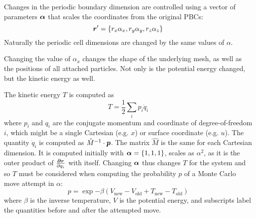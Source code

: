 
 \label{sec:npt}

Changes in the periodic boundary dimension are controlled using a vector of parameters $\boldsymbol{\alpha}$ that scales the coordinates from the original PBCs:
\begin{equation}
\boldsymbol{r}' = \{ r_x \alpha_x, r_y \alpha_y, r_z \alpha_z \}
\end{equation} 
Naturally the periodic cell dimensions are changed by the same values of $\alpha$.

Changing the value of $\alpha_x$ changes the shape of the underlying mesh, as well as the positions of all attached particles.
Not only is the potential energy changed, but the kinetic energy as well.

The kinetic energy $T$ is computed as
\begin{equation}
T = \frac{1}{2} \sum_i p_i \dot{q}_i
\end{equation}
where $p_i$ and $q_i$ are the conjugate momentum and coordinate of degree-of-freedom $i$, which might be a single Cartesian (e.g. $x$) or surface coordinate (e.g. $u$).
The quantity $\dot{q}_i$ is computed as $\hat{M}^{-1} \cdot \boldsymbol{p}$.
The matrix $\hat{M}$ is the same for each Cartesian dimension.
It is computed initially with $\boldsymbol{\alpha}=\{1,1,1\}$, scales as $\alpha^2$, as it is the outer product of $\frac{\boldsymbol{\partial r}}{\partial q_i}$ with itself.
Changing $\boldsymbol{\alpha}$ thus changes $T$ for the system and so $T$ must be considered when computing the probability $p$ of a Monte Carlo move attempt in $\alpha$:
\begin{equation}
p = \exp{-\beta (V_\textrm{new}-V_\textrm{old}+T_\textrm{new}-T_\textrm{old})}
\end{equation} 
where $\beta$ is the inverse temperature, $V$ is the potential energy, and subscripts label the quantities before and after the attempted move. 
